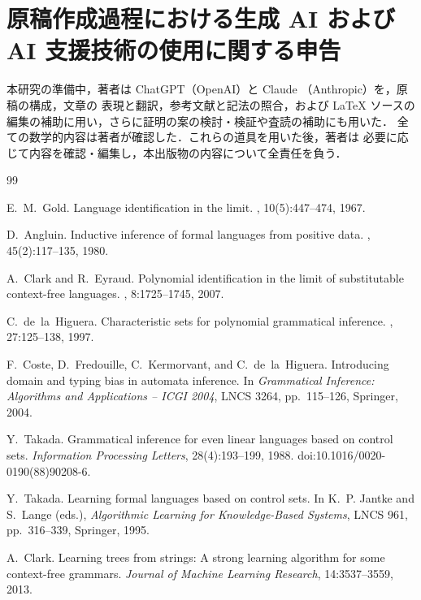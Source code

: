 \documentclass[11pt,a4paper]{ltjsarticle}
\numberwithin{equation}{section}
\theoremstyle{plain}
\theoremstyle{definition}
\theoremstyle{remark}
\theoremstyle{plain}
\begin{document}
\section*{原稿作成過程における生成 AI および AI 支援技術の使用に関する申告}
本研究の準備中，著者は ChatGPT（OpenAI）と Claude
（Anthropic）を，原稿の構成，文章の
表現と翻訳，参考文献と記法の照合，および
\LaTeX{} ソースの編集の補助に用い，さらに証明の案の検討・検証や査読の補助にも用いた．
全ての数学的内容は著者が確認した．これらの道具を用いた後，著者は
必要に応じて内容を確認・編集し，本出版物の内容について全責任を負う．

\begin{thebibliography}{99}

E.~M.~Gold.
\newblock Language identification in the limit.
, 10(5):447--474, 1967.

D.~Angluin.
\newblock Inductive inference of formal languages from positive data.
, 45(2):117--135, 1980.

A.~Clark and R.~Eyraud.
\newblock Polynomial identification in the limit of substitutable context-free
languages.
, 8:1725--1745, 2007.

C.~de~la~Higuera.
\newblock Characteristic sets for polynomial grammatical inference.
, 27:125--138, 1997.

F.~Coste, D.~Fredouille, C.~Kermorvant, and C.~de~la~Higuera.
\newblock Introducing domain and typing bias in automata inference.
\newblock In \emph{Grammatical Inference: Algorithms and Applications -- ICGI 2004},
LNCS 3264, pp.~115--126, Springer, 2004.

Y.~Takada.
\newblock Grammatical inference for even linear languages based on control sets.
\newblock \emph{Information Processing Letters}, 28(4):193--199, 1988.
\newblock doi:10.1016/0020-0190(88)90208-6.

Y.~Takada.
\newblock Learning formal languages based on control sets.
\newblock In K.~P. Jantke and S.~Lange (eds.), \emph{Algorithmic Learning
for Knowledge-Based Systems}, LNCS 961, pp.~316--339, Springer, 1995.

A.~Clark.
\newblock Learning trees from strings: A strong learning algorithm for some context-free grammars.
\newblock \emph{Journal of Machine Learning Research}, 14:3537--3559, 2013.


\end{thebibliography}
\end{document}
